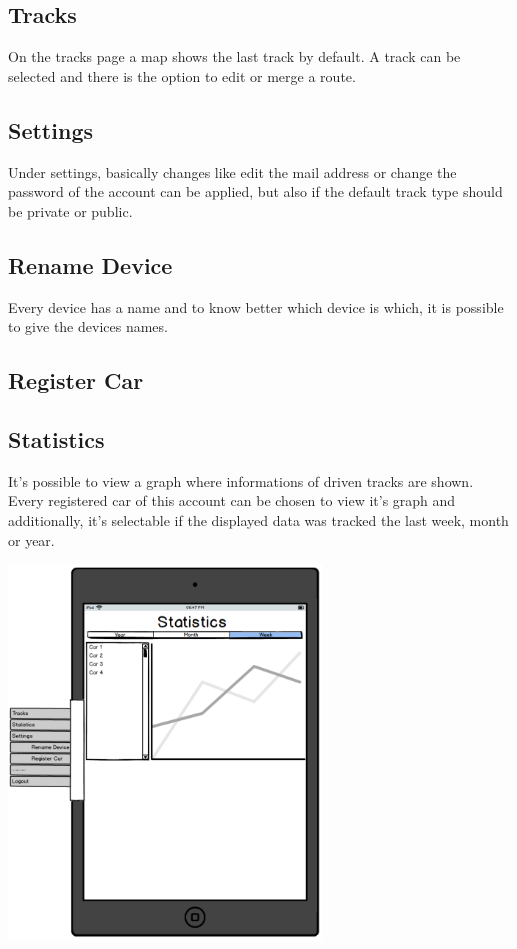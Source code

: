 \subsection{Tracks}
On the tracks page a map shows the last track by default. A track can be selected and there is the option to edit or merge a route.
\subsection{Settings}
Under settings, basically changes like edit the mail address or change the password of the account can be applied, but also if the default track type should be private or public.
\subsection{Rename Device}
Every device has a name and to know better which device is which, it is possible to give the devices names.
\subsection{Register Car}

\subsection{Statistics}
It’s possible to view a graph where informations of driven tracks are shown. Every registered car of this account can be chosen to view it’s graph and additionally, it’s selectable if the displayed data was tracked the last week, month or year.
\begin{center}
\includegraphics[width=0.625\textwidth]{bilder/Tablet}
\end{center}
